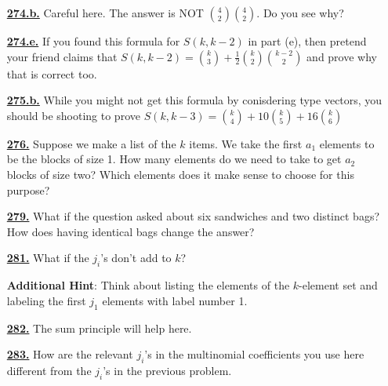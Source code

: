 \documentclass[10pt,]{book}
\theoremstyle{plain}
\theoremstyle{definition}
\theoremstyle{definition}
\theoremstyle{definition}
\numberwithin{equation}{chapter}
\begin{document}
\begin{itemize}[itemsep=1em]
\hypertarget{a-274.b}{}\item[\textbf{\hyperref[task-255]{274.b.}}]
\hypertarget{p-1404}{}%
Careful here.  The answer is NOT \(\binom{4}{2}\binom{4}{2}\).  Do you see why?%

\hypertarget{a-274.e}{}\item[\textbf{\hyperref[task-258]{274.e.}}]
\hypertarget{p-1408}{}%
If you found this formula for \(S(k,k-2)\) in part (e), then pretend your friend claims that \(S(k, k-2) = \binom{k}{3} + \frac{1}{2}\binom{k}{2}\binom{k-2}{2}\) and prove why that is correct too.%

\hypertarget{a-275.b}{}\item[\textbf{\hyperref[task-260]{275.b.}}]
\hypertarget{p-1412}{}%
While you might not get this formula by conisdering type vectors, you should be shooting to prove \(S(k, k-3) = \binom{k}{4} + 10 \binom{k}{5} + 16 \binom{k}{6}\)%

\hypertarget{a-276}{}\item[\textbf{\hyperref[partitionsgivenpartsize]{276.}}]
\hypertarget{p-1414}{}%
Suppose we make a list of the \(k\) items. We take the first \(a_1\) elements to be the blocks of size 1. How many elements do we need to take to get \(a_2\) blocks of size two? Which elements does it make sense to choose for this purpose?%

\hypertarget{a-279}{}\item[\textbf{\hyperref[caterer2]{279.}}]
\hypertarget{p-1421}{}%
What if the question asked about six sandwiches and two distinct bags? How does having identical bags change the answer?%

\hypertarget{a-281}{}\item[\textbf{\hyperref[activity-274]{281.}}]
\hypertarget{p-1428}{}%
What if the \(j_i\)'s don't add to \(k\)?%

\par\smallskip
\noindent\textbf{Additional Hint}: \hypertarget{p-1429}{}%
Think about listing the elements of the \(k\)-element set and labeling the first \(j_1\) elements with label number 1.%

\hypertarget{a-282}{}\item[\textbf{\hyperref[activity-275]{282.}}]
\hypertarget{p-1432}{}%
The sum principle will help here.%

\hypertarget{a-283}{}\item[\textbf{\hyperref[activity-276]{283.}}]
\hypertarget{p-1435}{}%
How are the relevant \(j_i\)'s in the multinomial coefficients you use here different from the \(j_i\)'s in the previous problem.%


\end{itemize}
\end{document}
